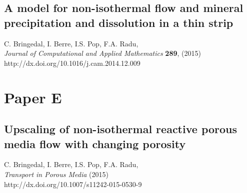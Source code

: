 \section*{A model for non-isothermal flow and mineral precipitation and dissolution in a thin strip}

\noindent C. Bringedal, I. Berre, I.S. Pop, F.A. Radu, \\


\noindent \textit{Journal of Computational and Applied Mathematics} \textbf{289}, (2015)\\ http://dx.doi.org/10.1016/j.cam.2014.12.009

\cleardoublepage





\chapter*{Paper E}
\section*{Upscaling of non-isothermal reactive porous media flow with changing porosity}

\noindent C. Bringedal, I. Berre, I.S. Pop, F.A. Radu, \\

\noindent \textit{Transport in Porous Media} (2015)\\ http://dx.doi.org/10.1007/s11242-015-0530-9

\cleardoublepage





